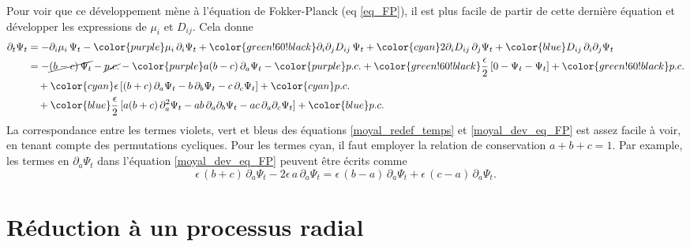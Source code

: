 \documentclass[openany,a4paper,12pt]{article}
\begin{document}
\par Pour voir que ce développement mène à l'équation de Fokker-Planck (eq \ref{eq_FP}), il est plus facile de partir de cette dernière équation et développer les expressions de $\mu_i$ et $D_{ij}$. Cela donne
%
\begin{equation}\label{moyal_dev_eq_FP}
\begin{split}
	\partial_t \Psi_t
	&= - \partial_i \mu_i \, \Psi_t
	- {\color{purple} \mu_i \, \partial_i \Psi_t }
	+ {\color{green!60!black} \partial_i\partial_j D_{ij} \, \Psi_t }
	+ {\color{cyan} 2 \partial_i D_{ij} \, \partial_j \Psi_t }
	+ {\color{blue} D_{ij} \,  \partial_i\partial_j \Psi_t } \\
	&= - \cancel{(b-c) \, \Psi_t} - \cancel{p.c.}
	- {\color{purple} a(b-c)\, \partial_a \Psi_t }
	- {\color{purple} p.c. }
	+ {\color{green!60!black} \frac \epsilon 2 \, [0-\Psi_t-\Psi_t] }
	+ {\color{green!60!black} p.c. } \\
	&\quad + {\color{cyan} \epsilon \, [ (b+c) \, \partial_a \Psi_t - b \, \partial_b \Psi_t - c \, \partial_c \Psi_t ] }
	+ {\color{cyan} p.c. } \\
	&\quad + {\color{blue} \frac \epsilon 2 \, [ a(b+c) \, \partial_a^2 \Psi_t - ab \, \partial_a\partial_b \Psi_t - ac \, \partial_a\partial_c \Psi_t ] }
	+ {\color{blue} p.c. }
\end{split} 
\end{equation}
%
La correspondance entre les termes violets, vert et bleus des équations \ref{moyal_redef_temps} et \ref{moyal_dev_eq_FP} est assez facile à voir, en tenant compte des permutations cycliques. Pour les termes cyan, il faut employer la relation de conservation $a+b+c=1$. Par example, les termes en $\partial_a\Psi_t$ dans l'équation \ref{moyal_dev_eq_FP} peuvent être écrits comme
%
\begin{equation}\label{moyal_terme_cyan_corresp}
	\epsilon\, (b+c)\, \partial_a\Psi_t -2\epsilon\, a\, \partial_a\Psi_t = \epsilon\, (b-a)\, \partial_a\Psi_t + \epsilon\, (c-a)\, \partial_a\Psi_t.
\end{equation}
%

\section{Réduction à un processus radial}
\end{document}
